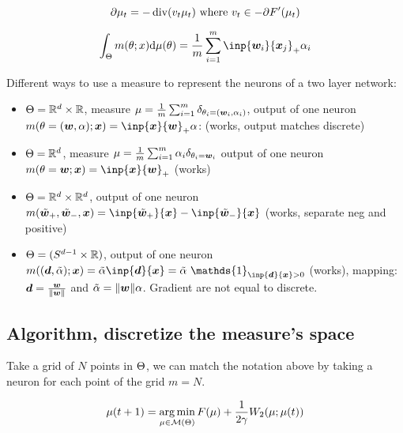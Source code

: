 \begin{equation}
	\partial \mu_t = - \operatorname*{div}(v_t \mu_t) \text{ where } v_t \in - \partial F'(\mu_t)
\end{equation}

\begin{equation}
	\int_\paramS m(\param; x) \dd \mu(\param) = \frac{1}{m} \sum_{i=1}^{m} \inp{\vw_i}{\vx_j}_+ \alpha_i
\end{equation}

Different ways to use a measure to represent the neurons of a two layer network:

\begin{itemize}
	\item $\Theta = \mathbb{R}^d \times \mathbb{R}$, measure $\mu = \frac{1}{m} \sum_{i=1}^{m} \delta_{\theta_i = ({\bm{w}}_i, \alpha_i)}$, output of one neuron $m(\param=(\vw,\alpha); \vx) = \inp{\vx}{\vw}_+ \alpha$: (works, output matches discrete)
	\item $\Theta = \mathbb{R}^d$, measure $\mu = \frac{1}{m} \sum_{i=1}^{m} \alpha_i \delta_{\theta_i = {\bm{w}}_i}$ output of one neuron $m(\param=\vw; \vx) = \inp{\vx}{\vw}_+$ (works)
	\item $\Theta = \mathbb{R}^d \times \mathbb{R}^d$, output of one neuron $m(\tilde{\vw}_+, \tilde{\vw}_-, \vx) = \inp{\tilde{\vw}_+}{\vx} - \inp{\tilde{\vw}_-}{\vx}$ (works, separate neg and positive)
	\item $\Theta = (S^{d-1} \times \mathbb{R})$, output of one neuron $m((\vd, \tilde{\alpha}); \vx) = \tilde{\alpha} \inp{\vd}{\vx} = \tilde{\alpha}\  \mathds{1}_{\inp{\vd}{\vx}>0} $ (works), mapping: ${\bm{d}} = \frac{{\bm{w}}}{\lVert{\bm{w}}\rVert}$ and $\tilde{\alpha}=\lVert{\bm{w}}\rVert \alpha$. Gradient are not equal to discrete.
\end{itemize}

\subsection{Algorithm, discretize the measure's space}

Take a grid of $N$ points in $\Theta$, we can match the notation above by taking a neuron for each point of the grid $m=N$.

\begin{equation}
	\mu(t+1) = \operatorname*{arg\,min}_{\mu \in \mathcal{M}(\Theta)} F(\mu) + \frac{1}{2 \gamma} W_2(\mu; \mu(t))
\end{equation}



